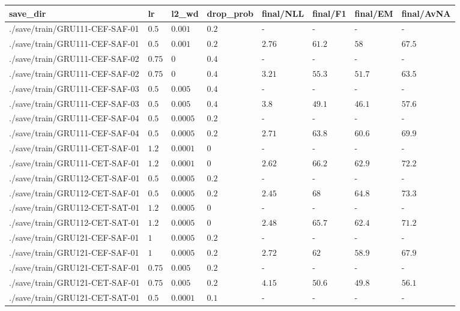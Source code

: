 \begin{table}[tbp]
\begin{tabular}{llllllll}
save\_dir & lr & l2\_wd & drop\_prob & final/NLL & final/F1 & final/EM & final/AvNA \\ \hline
./save/train/GRU111-CEF-SAF-01 & $0.5$ & $0.001$ & $0.2$ & - & - & - & - \\
./save/train/GRU111-CEF-SAF-01 & $0.5$ & $0.001$ & $0.2$ & $2.76$ & $61.2$ & $58$ & $67.5$ \\
./save/train/GRU111-CEF-SAF-02 & $0.75$ & $0$ & $0.4$ & - & - & - & - \\
./save/train/GRU111-CEF-SAF-02 & $0.75$ & $0$ & $0.4$ & $3.21$ & $55.3$ & $51.7$ & $63.5$ \\
./save/train/GRU111-CEF-SAF-03 & $0.5$ & $0.005$ & $0.4$ & - & - & - & - \\
./save/train/GRU111-CEF-SAF-03 & $0.5$ & $0.005$ & $0.4$ & $3.8$ & $49.1$ & $46.1$ & $57.6$ \\
./save/train/GRU111-CEF-SAF-04 & $0.5$ & $0.0005$ & $0.2$ & - & - & - & - \\
./save/train/GRU111-CEF-SAF-04 & $0.5$ & $0.0005$ & $0.2$ & $2.71$ & $63.8$ & $60.6$ & $69.9$ \\
./save/train/GRU111-CET-SAF-01 & $1.2$ & $0.0001$ & $0$ & - & - & - & - \\
./save/train/GRU111-CET-SAF-01 & $1.2$ & $0.0001$ & $0$ & $2.62$ & $66.2$ & $62.9$ & $72.2$ \\
./save/train/GRU112-CET-SAF-01 & $0.5$ & $0.0005$ & $0.2$ & - & - & - & - \\
./save/train/GRU112-CET-SAF-01 & $0.5$ & $0.0005$ & $0.2$ & $2.45$ & $68$ & $64.8$ & $73.3$ \\
./save/train/GRU112-CET-SAT-01 & $1.2$ & $0.0005$ & $0$ & - & - & - & - \\
./save/train/GRU112-CET-SAT-01 & $1.2$ & $0.0005$ & $0$ & $2.48$ & $65.7$ & $62.4$ & $71.2$ \\
./save/train/GRU121-CEF-SAF-01 & $1$ & $0.0005$ & $0.2$ & - & - & - & - \\
./save/train/GRU121-CEF-SAF-01 & $1$ & $0.0005$ & $0.2$ & $2.72$ & $62$ & $58.9$ & $67.9$ \\
./save/train/GRU121-CET-SAF-01 & $0.75$ & $0.005$ & $0.2$ & - & - & - & - \\
./save/train/GRU121-CET-SAF-01 & $0.75$ & $0.005$ & $0.2$ & $4.15$ & $50.6$ & $49.8$ & $56.1$ \\
./save/train/GRU121-CET-SAT-01 & $0.5$ & $0.0001$ & $0.1$ & - & - & - & - \\

\end{tabular}
\end{table}
